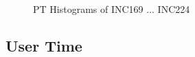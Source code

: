 \begin{figure}[hp!]
{		\label{fig:inc192_pt_hist}
	}
	\caption{PT Histograms of INC169 ... INC224~\label{fig:new_pt_hist4}}
\end{figure}

\pagebreak
\newpage

\subsection{User Time}

